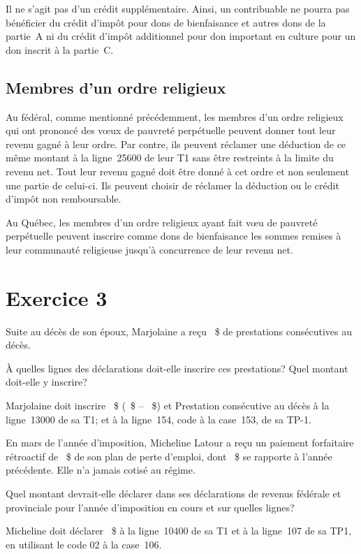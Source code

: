 Il ne s'agit pas d'un crédit supplémentaire. Ainsi, un contribuable ne pourra pas bénéficier du crédit d'impôt pour dons de bienfaisance et autres dons de la partie~A ni du crédit d'impôt additionnel pour don important en culture pour un don inscrit à la partie~C.

\subsection{Membres d'un ordre religieux}
Au fédéral, comme mentionné précédemment, les membres d'un ordre religieux qui ont prononcé des vœux de pauvreté perpétuelle peuvent donner tout leur revenu gagné à leur ordre. Par contre, ils peuvent réclamer une déduction de ce même montant à la ligne~25600 de leur T1 sans être restreints à la limite du revenu net. Tout leur revenu gagné doit être donné à cet ordre et non seulement une partie de celui-ci. Ils peuvent choisir de réclamer la déduction ou le crédit d'impôt non remboursable.

Au Québec, les membres d'un ordre religieux ayant fait vœu de pauvreté perpétuelle peuvent inscrire comme dons de bienfaisance les sommes remises à leur communauté religieuse jusqu'à concurrence de leur revenu net. 



\section{Exercice 3}
\setcounter{question}{0}
\begin{question}
	Suite au décès de son époux, Marjolaine a reçu ~\$ de prestations consécutives au décès.
	
	À quelles lignes des déclarations doit-elle inscrire ces prestations? Quel montant doit-elle y inscrire?
\end{question}
Marjolaine doit inscrire ~\$ (~\$ $–$ ~\$) et \og Prestation consécutive au décès \fg{} à la ligne~13000 de sa T1; et à la ligne~154, code  \fg{} à la case~153, de sa TP-1.

\begin{question}
	En mars de l'année d'imposition, Micheline Latour a reçu un paiement forfaitaire rétroactif de ~\$ de son plan de perte d'emploi, dont ~\$ se rapporte à l'année précédente. Elle n'a jamais cotisé au régime.
\end{question}
\setcounter{sousQuestion}{0}
\begin{sousQuestion}
	Quel montant devrait-elle déclarer dans ses déclarations de revenus fédérale et provinciale pour l'année d'imposition en cours et sur quelles lignes?
\end{sousQuestion}
Micheline doit déclarer ~\$ à la ligne~10400 de sa T1 et à la ligne~107 de sa TP1, en utilisant le code 02 à la case~106.

